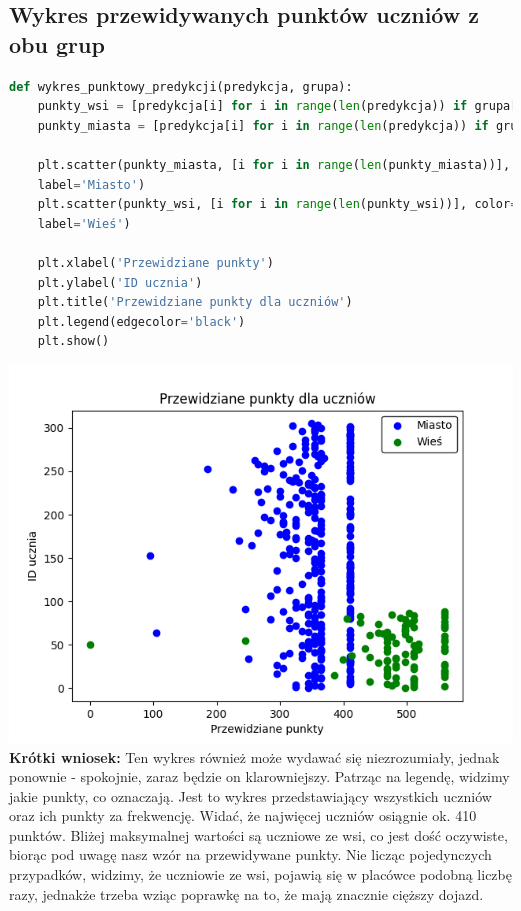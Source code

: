 \documentclass{article}
\begin{document}
\subsection{Wykres przewidywanych punktów uczniów z obu grup}
\begin{lstlisting}[language=Python]
def wykres_punktowy_predykcji(predykcja, grupa):
    punkty_wsi = [predykcja[i] for i in range(len(predykcja)) if grupa[i] == 'r']
    punkty_miasta = [predykcja[i] for i in range(len(predykcja)) if grupa[i] == 'u']

    plt.scatter(punkty_miasta, [i for i in range(len(punkty_miasta))], color='blue', 
    label='Miasto')
    plt.scatter(punkty_wsi, [i for i in range(len(punkty_wsi))], color='green',
    label='Wieś')

    plt.xlabel('Przewidziane punkty')
    plt.ylabel('ID ucznia')
    plt.title('Przewidziane punkty dla uczniów')
    plt.legend(edgecolor='black')
    plt.show()
\end{lstlisting}
\includegraphics[width=\textwidth]{punkty_przewidziane.png}
\textbf{Krótki wniosek:} Ten wykres również może wydawać się niezrozumiały, jednak ponownie - spokojnie, zaraz będzie on klarowniejszy. Patrząc na legendę, widzimy jakie punkty, co oznaczają. Jest to wykres przedstawiający wszystkich uczniów oraz ich punkty za frekwencję. Widać, że najwięcej uczniów osiągnie ok. 410 punktów. Bliżej maksymalnej wartości są uczniowe ze wsi, co jest dość oczywiste, biorąc pod uwagę nasz wzór na przewidywane punkty. Nie licząc pojedynczych przypadków, widzimy, że uczniowie ze wsi, pojawią się w placówce podobną liczbę razy, jednakże trzeba wziąc poprawkę na to, że mają znacznie cięższy dojazd.
\vspace{15cm}
\end{document}
